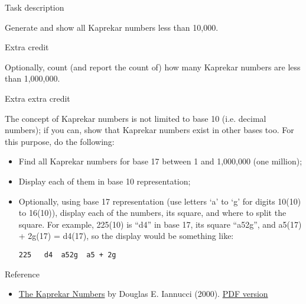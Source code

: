 \pagebreak{}

\begin{description}
\item[Task description]
\end{description}

Generate and show all Kaprekar numbers less than 10,000.

\begin{description}
\item[Extra credit]
\end{description}

Optionally, count (and report the count of) how many Kaprekar numbers
are less than 1,000,000.

\begin{description}
\item[Extra extra credit]
\end{description}

The concept of Kaprekar numbers is not limited to base 10 (i.e. decimal
numbers); if you can, show that Kaprekar numbers exist in other bases
too. For this purpose, do the following:

\begin{itemize}
\item
  Find all Kaprekar numbers for base 17 between 1 and 1,000,000 (one
  million);
\item
  Display each of them in base 10 representation;
\item
  Optionally, using base 17 representation (use letters `a' to `g' for
  digits 10(10) to 16(10)), display each of the numbers, its square, and
  where to split the square. For example, 225(10) is ``d4'' in base 17,
  its square ``a52g'', and a5(17) + 2g(17) = d4(17), so the display
  would be something like:

\begin{verbatim}
225   d4  a52g  a5 + 2g
\end{verbatim}
\end{itemize}

\begin{description}
\item[Reference]
\end{description}

\begin{itemize}
\item
  \href{http://www.cs.uwaterloo.ca/journals/JIS/VOL3/iann2a.html}{The
  Kaprekar Numbers} by Douglas E. Iannucci (2000).
  \href{http://pictor.math.uqam.ca/~plouffe/OEIS/jis/The\%20Kaprekar\%20Numbers.pdf}{PDF
  version}
\end{itemize}

